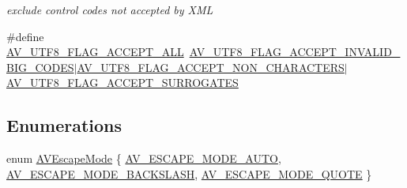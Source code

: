 \begin{DoxyCompactItemize}
\begin{DoxyCompactList}\small\item\em exclude control codes not accepted by X\+ML \end{DoxyCompactList}\item 
\#define \hyperlink{group__lavu__string_ga4825349f5346880c6ac32b0847e9a73a}{A\+V\+\_\+\+U\+T\+F8\+\_\+\+F\+L\+A\+G\+\_\+\+A\+C\+C\+E\+P\+T\+\_\+\+A\+LL}~\hyperlink{group__lavu__string_ga61b431e73b72949c839788914a599207}{A\+V\+\_\+\+U\+T\+F8\+\_\+\+F\+L\+A\+G\+\_\+\+A\+C\+C\+E\+P\+T\+\_\+\+I\+N\+V\+A\+L\+I\+D\+\_\+\+B\+I\+G\+\_\+\+C\+O\+D\+ES}$\vert$\hyperlink{group__lavu__string_gadc5f344d3eafe34e9c3169b1178e137b}{A\+V\+\_\+\+U\+T\+F8\+\_\+\+F\+L\+A\+G\+\_\+\+A\+C\+C\+E\+P\+T\+\_\+\+N\+O\+N\+\_\+\+C\+H\+A\+R\+A\+C\+T\+E\+RS}$\vert$\hyperlink{group__lavu__string_ga39a93e11907ca4b116d8d179cbdb570d}{A\+V\+\_\+\+U\+T\+F8\+\_\+\+F\+L\+A\+G\+\_\+\+A\+C\+C\+E\+P\+T\+\_\+\+S\+U\+R\+R\+O\+G\+A\+T\+ES}
\end{DoxyCompactItemize}
\subsection*{Enumerations}
\begin{DoxyCompactItemize}
\item 
enum \hyperlink{group__lavu__string_gaef885958293f07153383f99db573ff5a}{A\+V\+Escape\+Mode} \{ \hyperlink{group__lavu__string_ggaef885958293f07153383f99db573ff5aa342d7bf60c9a7cb7a886f70f81ac5071}{A\+V\+\_\+\+E\+S\+C\+A\+P\+E\+\_\+\+M\+O\+D\+E\+\_\+\+A\+U\+TO}, 
\hyperlink{group__lavu__string_ggaef885958293f07153383f99db573ff5aa8b2d26951a9e06d8f7c12977a204eaf9}{A\+V\+\_\+\+E\+S\+C\+A\+P\+E\+\_\+\+M\+O\+D\+E\+\_\+\+B\+A\+C\+K\+S\+L\+A\+SH}, 
\hyperlink{group__lavu__string_ggaef885958293f07153383f99db573ff5aa84da6c323003df474c690ccf5d4e5d67}{A\+V\+\_\+\+E\+S\+C\+A\+P\+E\+\_\+\+M\+O\+D\+E\+\_\+\+Q\+U\+O\+TE}
 \}
\end{DoxyCompactItemize}
